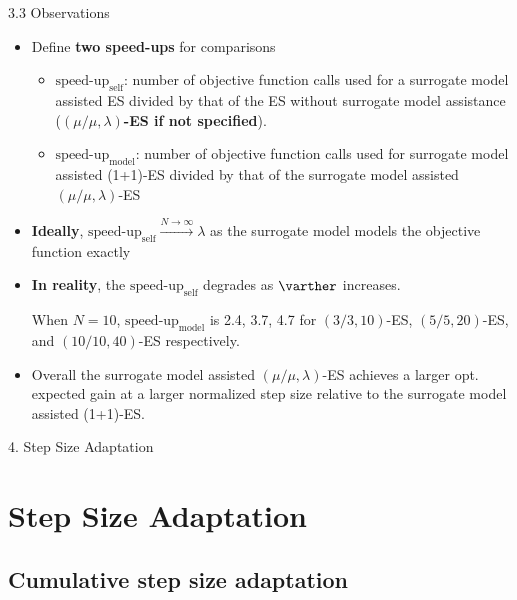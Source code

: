 \documentclass{beamer}
\begin{document}
\begin{frame}{3.3 Observations}
\begin{itemize}
    \item Define \textbf{two speed-ups} for comparisons 
    \begin{itemize}
        \item $\text{speed-up}_{\text{self}}$: number of objective function calls used for a surrogate model assisted ES divided by that of the ES without surrogate model assistance (\textbf{$(\mu/\mu,\lambda)$-ES if not specified}). 
        \item $\text{speed-up}_{\text{model}}$: number of objective function calls used for surrogate model assisted (1+1)-ES divided by that of the surrogate model assisted $(\mu/\mu,\lambda)$-ES
    \end{itemize}     
    \item \textbf{Ideally}, $\text{speed-up}_{\text{self}} \overset{N\rightarrow\infty}{\rightarrow} \lambda$ as the surrogate model models the objective function exactly
    \item \textbf{In reality}, the  $\text{speed-up}_{\text{self}}$ degrades as $\varther$ increases. 
    
    When $N=10$, $\text{speed-up}_{\text{model}}$ is 2.4, 3.7, 4.7 for $(3/3,10)$-ES, $(5/5,20)$-ES, and $(10/10,40)$-ES respectively. 
    \item Overall the surrogate model assisted $(\mu/\mu,\lambda)$-ES achieves a larger opt. expected gain at a larger normalized step size relative to the surrogate model assisted (1+1)-ES. 
\end{itemize}
\end{frame}

\begin{frame}[plain,c]
\begin{center}
\Huge 4. Step Size Adaptation
\end{center}
\end{frame}
\section{Step Size Adaptation}
\subsection{Cumulative step size adaptation}
\end{document}
